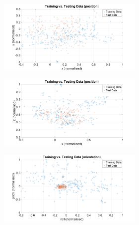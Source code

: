 \begin{figure}
  \centering
  \begin{subfigure}{\textwidth}
    \begin{subfigure}{0.48\textwidth}
      \includegraphics[clip, trim = 80 0 100 0, width=\textwidth]{figures/chapter5/tr_v_ts_xy}
    \end{subfigure}
    \begin{subfigure}{0.48\textwidth}
      \includegraphics[clip, trim = 80 0 100 0, width=\textwidth]{figures/chapter5/tr_v_ts_xz}
    \end{subfigure}
    \caption{}
  \end{subfigure}
  \begin{subfigure}{\textwidth}
    \begin{subfigure}{0.48\textwidth}
      \includegraphics[clip, trim = 80 0 100 0, width=\textwidth]{figures/chapter5/tr_v_ts_rollpitch}

\end{subfigure}
\end{subfigure}
\end{figure}
